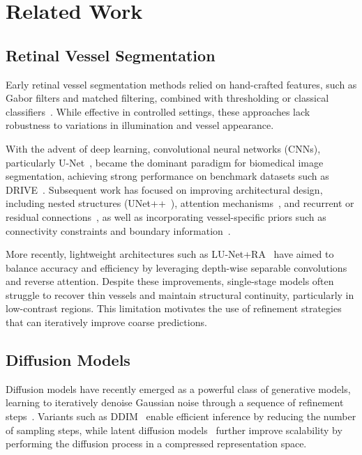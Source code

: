 \documentclass[journal,article,submit,pdftex,moreauthors]{Definitions/mdpi}
\begin{document}

\section{Related Work}
\label{sec:related}

\subsection{Retinal Vessel Segmentation}

Early retinal vessel segmentation methods relied on hand-crafted features, such as Gabor filters and matched filtering, combined with thresholding or classical classifiers~\cite{Soares2006, Mendonca2006}. While effective in controlled settings, these approaches lack robustness to variations in illumination and vessel appearance.

With the advent of deep learning, convolutional neural networks (CNNs), particularly U-Net~\cite{Ronneberger2015}, became the dominant paradigm for biomedical image segmentation, achieving strong performance on benchmark datasets such as DRIVE~\cite{Staal2004}. Subsequent work has focused on improving architectural design, including nested structures (UNet++~\cite{Zhou2018UNetpp}), attention mechanisms~\cite{Oktay2018AttUNet, Schlemper2019AG}, and recurrent or residual connections~\cite{Alom2018R2UNet}, as well as incorporating vessel-specific priors such as connectivity constraints and boundary information~\cite{Fu2016DeepVessel, Liskowski2016, Shin2019Connectivity}.

More recently, lightweight architectures such as LU-Net+RA~\cite{Hernandez2025} have aimed to balance accuracy and efficiency by leveraging depth-wise separable convolutions and reverse attention. Despite these improvements, single-stage models often struggle to recover thin vessels and maintain structural continuity, particularly in low-contrast regions. This limitation motivates the use of refinement strategies that can iteratively improve coarse predictions.

\subsection{Diffusion Models}

Diffusion models have recently emerged as a powerful class of generative models, learning to iteratively denoise Gaussian noise through a sequence of refinement steps~\cite{Ho2020}. Variants such as DDIM~\cite{Song2021} enable efficient inference by reducing the number of sampling steps, while latent diffusion models~\cite{Rombach2022} further improve scalability by performing the diffusion process in a compressed representation space.
\end{document}
